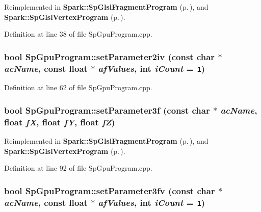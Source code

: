 Reimplemented in {\bf Spark::Sp\-Glsl\-Fragment\-Program} {\rm (p.\,\pageref{classSpark_1_1SpGlslFragmentProgram_a2})}, and {\bf Spark::Sp\-Glsl\-Vertex\-Program} {\rm (p.\,\pageref{classSpark_1_1SpGlslVertexProgram_a2})}.

Definition at line 38 of file Sp\-Gpu\-Program.cpp.
\subsubsection{\setlength{\rightskip}{0pt plus 5cm}bool Sp\-Gpu\-Program::set\-Parameter2iv (const char $\ast$ {\em ac\-Name}, const float $\ast$ {\em af\-Values}, int {\em i\-Count} = {\tt 1})\hspace{0.3cm}{\tt  [virtual]}}\label{classSpark_1_1SpGpuProgram_a17}


Definition at line 62 of file Sp\-Gpu\-Program.cpp.
\subsubsection{\setlength{\rightskip}{0pt plus 5cm}bool Sp\-Gpu\-Program::set\-Parameter3f (const char $\ast$ {\em ac\-Name}, float {\em f\-X}, float {\em f\-Y}, float {\em f\-Z})\hspace{0.3cm}{\tt  [virtual]}}\label{classSpark_1_1SpGpuProgram_a22}




Reimplemented in {\bf Spark::Sp\-Glsl\-Fragment\-Program} {\rm (p.\,\pageref{classSpark_1_1SpGlslFragmentProgram_a11})}, and {\bf Spark::Sp\-Glsl\-Vertex\-Program} {\rm (p.\,\pageref{classSpark_1_1SpGlslVertexProgram_a11})}.

Definition at line 92 of file Sp\-Gpu\-Program.cpp.
\subsubsection{\setlength{\rightskip}{0pt plus 5cm}bool Sp\-Gpu\-Program::set\-Parameter3fv (const char $\ast$ {\em ac\-Name}, const float $\ast$ {\em af\-Values}, int {\em i\-Count} = {\tt 1})\hspace{0.3cm}{\tt  [virtual]}}\label{classSpark_1_1SpGpuProgram_a26}




